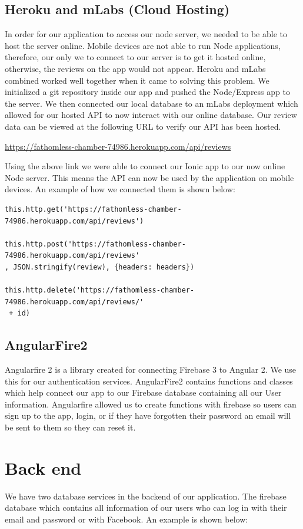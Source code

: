 \subsection{Heroku and mLabs (Cloud Hosting)}
In order for our application to access our node server, we needed to be able to host the server online. Mobile devices are not able to run Node applications, therefore, our only we to connect to our server is to get it hosted online, otherwise, the reviews on the app would not appear. Heroku and mLabs combined worked well together when it came to solving this problem. We initialized a git repository inside our app and pushed the Node/Express app to the server. We then connected our local database to an mLabs deployment which allowed for our hosted API to now interact with our online database. Our review data can be viewed at the following URL to verify our API has been hosted. 

 \url{ https://fathomless-chamber-74986.herokuapp.com/api/reviews}
 
Using the above link we were able to connect our Ionic app to our now online Node server. This means the API can now be used by the application on mobile devices. An example of how we connected them is shown below: 
 
 
 \begin{verbatim}
this.http.get('https://fathomless-chamber-74986.herokuapp.com/api/reviews')

this.http.post('https://fathomless-chamber-74986.herokuapp.com/api/reviews'
, JSON.stringify(review), {headers: headers})

this.http.delete('https://fathomless-chamber-74986.herokuapp.com/api/reviews/'
 + id)

 \end{verbatim}
\subsection{AngularFire2}
Angularfire 2 is a library created for connecting Firebase 3 to Angular 2. We use this for our authentication services. AngularFire2 contains functions and classes which help connect our app to our Firebase database containing all our User information. Angularfire allowed us to create functions with firebase so users can sign up to the app, login, or if they have forgotten their password an email will be sent to them so they can reset it.

\section{Back end}
We have two database services in the backend of our application. The firebase database which contains all information of our users who can log in with their email and password or with Facebook. An example is shown below:

